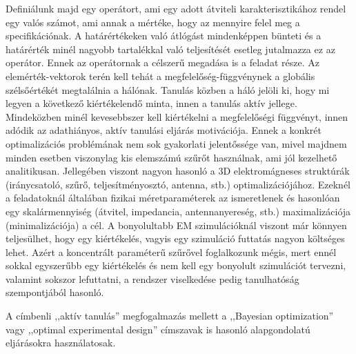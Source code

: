 \documentclass[12pt,a4paper,oneside]{report}
\begin{document}
Definiálunk majd egy operátort, ami egy adott átviteli karakterisztikához rendel egy valós számot, ami annak a mértéke, hogy az mennyire felel meg a specifikációnak. A határértékeken való átlógást mindenképpen bünteti és a határérték minél nagyobb tartalékkal való teljesítését esetleg jutalmazza ez az operátor. Ennek az operátornak a célszerű megadása is a feladat része. Az elemérték-vektorok terén kell tehát a megfelelőség-függvénynek a globális szélsőértékét megtalálnia a hálónak. Tanulás közben a háló jelöli ki, hogy mi legyen a következő kiértékelendő minta, innen a tanulás aktív jellege. Mindeközben minél kevesebbszer kell kiértékelni a megfelelőségi függvényt, innen adódik az adathiányos, aktív tanulási eljárás motivációja. Ennek a konkrét optimalizációs problémának nem sok gyakorlati jelentőssége van, mivel majdnem minden esetben viszonylag kis elemszámú szűrőt használnak, ami jól kezelhető analitikusan. Jellegében viszont nagyon hasonló a 3D elektromágneses struktúrák (iránycsatoló, szűrő, teljesítményosztó, antenna, stb.) optimalizációjához. Ezeknél a feladatoknál általában fizikai méretparaméterek az ismeretlenek és hasonlóan egy skalármennyiség (átvitel, impedancia, antennanyereség, stb.) maximalizációja (minimalizációja) a cél. A bonyolultabb EM szimulációknál viszont már könnyen teljesülhet, hogy egy kiértékelés, vagyis egy szimuláció futtatás nagyon költséges lehet. Azért a koncentrált paraméterű szűrővel foglalkozunk mégis, mert ennél sokkal egyszerűbb egy kiértékelés és nem kell egy bonyolult szimulációt tervezni, valamint sokszor lefuttatni, a rendszer viselkedése pedig tanulhatóság szempontjából hasonló.

A címbenli ,,aktív tanulás'' megfogalmazás mellett a ,,Bayesian optimization'' vagy ,,optimal experimental design'' címszavak is hasonló alapgondolatú eljárásokra használatosak.
\end{document}
